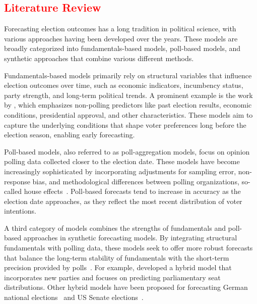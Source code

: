 \documentclass[doublespaced,12pt]{article}
\begin{document}
\begin{doublespacing}
\section{\textcolor{red}{Literature Review}}

Forecasting election outcomes has a long tradition in political science, with various approaches having been developed over the years. These models are broadly categorized into fundamentals-based models, poll-based models, and synthetic approaches that combine various different methods.

Fundamentals-based models primarily rely on structural variables that influence election outcomes over time, such as economic indicators, incumbency status, party strength, and long-term political trends. A prominent example is the work by \citet{hummel2014fundamental}, which emphasizes non-polling predictors like past election results, economic conditions, presidential approval, and other characteristics. These models aim to capture the underlying conditions that shape voter preferences long before the election season, enabling early forecasting.

Poll-based models, also referred to as poll-aggregation models, focus on opinion polling data collected closer to the election date. These models have become increasingly sophisticated by incorporating adjustments for sampling error, non-response bias, and methodological differences between polling organizations, so-called house effects~\citep{shirani2018disentangling,jackman2005pooling}. Poll-based forecasts tend to increase in accuracy as the election date approaches, as they reflect the most recent distribution of voter intentions.

A third category of models combines the strengths of fundamentals and poll-based approaches in synthetic forecasting models\citep{Lewis-Beck_Nadeau_Belanger_2016, Lewis-Beck_Dassonneville_2015}. By integrating structural fundamentals with polling data, these models seek to offer more robust forecasts that balance the long-term stability of fundamentals with the short-term precision provided by polls~\citep{munzert_2017}. For example, \citet{MONTALVO201952} developed a hybrid model that incorporates new parties and focuses on predicting parliamentary seat distributions. Other hybrid models have been proposed for forecasting German national elections~\citep{Stoetzer_Neunhoeffer_Gschwend_Munzert_Sternberg_2019} and US Senate elections~\citep{Chen_Garnett_Montgomery_2023}.


\end{doublespacing}
\end{document}
